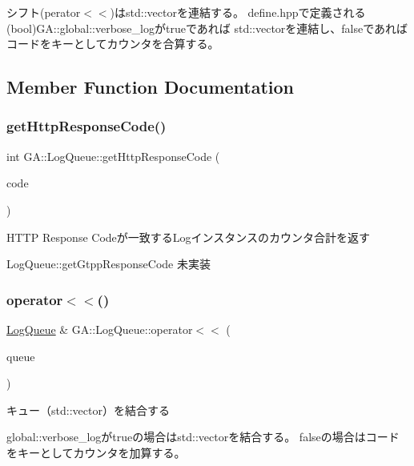 シフト(perator$<$$<$)はstd\+::vectorを連結する。 define.\+hppで定義される(bool)G\+A\+::global\+::verbose\+\_\+logがtrueであれば std\+::vectorを連結し、falseであればコードをキーとしてカウンタを合算する。 

\subsection{Member Function Documentation}
\mbox{\label{class_g_a_1_1_log_queue_ad2026bee29a87a03824227189cf13fa3}} 
\subsubsection{\texorpdfstring{getHttpResponseCode()}{getHttpResponseCode()}}
{\footnotesize\ttfamily int G\+A\+::\+Log\+Queue\+::get\+Http\+Response\+Code (\begin{DoxyParamCaption}\item[{const uint64\+\_\+t \&}]{code }\end{DoxyParamCaption})}



H\+T\+TP Response Codeが一致する\+Logインスタンスのカウンタ合計を返す 

Log\+Queue\+::get\+Gtpp\+Response\+Code 未実装 \mbox{\label{class_g_a_1_1_log_queue_ad48e5dce58ea14ef6f40eb27fd1d6e95}} 
\subsubsection{\texorpdfstring{operator$<$$<$()}{operator<<()}}
{\footnotesize\ttfamily \mbox{\hyperlink{class_g_a_1_1_log_queue}{Log\+Queue}} \& G\+A\+::\+Log\+Queue\+::operator$<$$<$ (\begin{DoxyParamCaption}\item[{const \mbox{\hyperlink{class_g_a_1_1_log_queue}{Log\+Queue}} \&}]{queue }\end{DoxyParamCaption})}



キュー（std\+::vector）を結合する 

global\+::verbose\+\_\+logがtrueの場合はstd\+::vectorを結合する。 falseの場合はコードをキーとしてカウンタを加算する。 \mbox{\label{class_g_a_1_1_log_queue_ab58dec28bf80d687c364ab54f84ebb36}} 
